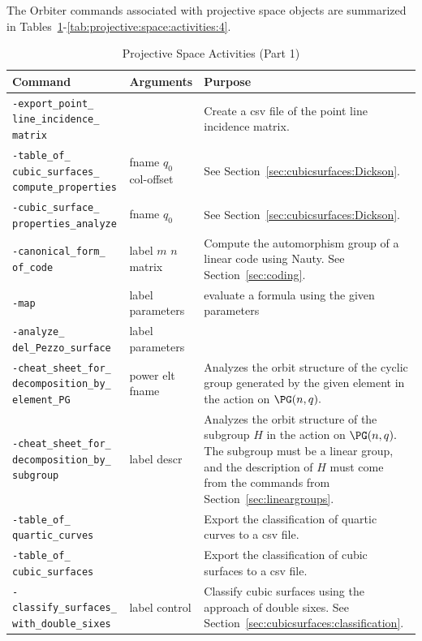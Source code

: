 The Orbiter commands associated with projective space objects are summarized in 
Tables~\ref{tab:projective:space:activities:1}-\ref{tab:projective:space:activities:4}.
\begin{table}
	\begin{center}
	\begin{tabular}{|p{4cm}|p{3cm}|p{7cm}|}
		\hline
		Command & Arguments & Purpose \\
		\hline
		\hline
		\verb'-export_point_' \verb'line_incidence_' \verb'matrix' &  &  Create a csv file of the point line incidence matrix. \\
		\hline
		\verb'-table_of_' \verb'cubic_surfaces_' \verb'compute_properties' &  fname $q_0$ col-offset  &   See Section~\ref{sec:cubicsurfaces:Dickson}. \\
		\hline
		\verb'-cubic_surface_' \verb'properties_analyze' & fname $q_0$    &  See Section~\ref{sec:cubicsurfaces:Dickson}. \\
		\hline
		\verb'-canonical_form_' \verb'of_code' &  label $m$ $n$ matrix  &  Compute the automorphism group of a linear code using Nauty. See Section~\ref{sec:coding}.  \\
		\hline
		\verb'-map' & label parameters   &  evaluate a formula using the given parameters \\
		\hline
		\verb'-analyze_' \verb'del_Pezzo_surface' &  label parameters  &   \\
		\hline
		\verb'-cheat_sheet_for_' \verb'decomposition_by_' \verb'element_PG' & power elt fname   & 
		Analyzes the orbit structure of the cyclic group 
		generated by the given element in the action on $\PG(n,q).$ \\
		\hline
		\verb'-cheat_sheet_for_' \verb'decomposition_by_' \verb'subgroup' & label descr   & 
		Analyzes the orbit structure of the subgroup $H$ in the action on $\PG(n,q).$ 
		The subgroup must be a linear group, 
		and the description of $H$ must come from the commands from Section~\ref{sec:lineargroups}. \\
		\hline
		\verb'-table_of_' \verb'quartic_curves' &    &  Export the classification of quartic curves to a csv file. \\
		\hline
		\verb'-table_of_' \verb'cubic_surfaces' &    &  Export the classification of cubic surfaces to a csv file. \\
		\hline
		\verb'-classify_surfaces_' \verb'with_double_sixes' & label control   & Classify cubic surfaces using the approach of double sixes. 
		See Section~\ref{sec:cubicsurfaces:classification}.  \\
		\hline
		\end{tabular}
	\end{center}
	\caption{\label{tab:projective:space:activities:1}Projective Space Activities (Part 1)}
\end{table}
